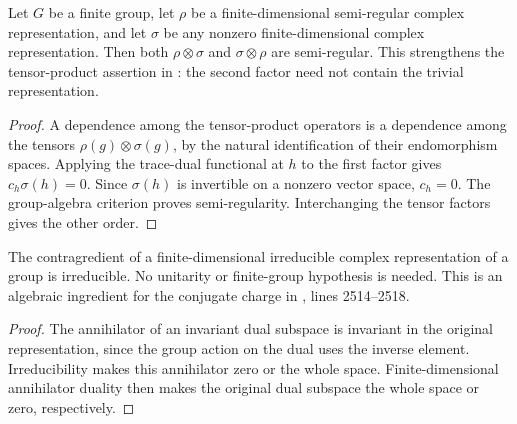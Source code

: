 \begin{lemma}
    \label{thm:peps_semiregular_nonzero_tensor}
    \leanok
    Let $G$ be a finite group, let $\rho$ be a finite-dimensional
    semi-regular complex representation, and let $\sigma$ be any
    nonzero finite-dimensional complex representation. Then both
    $\rho\otimes\sigma$ and $\sigma\otimes\rho$ are semi-regular.
    This strengthens the tensor-product assertion in
    \cite[Lemma~5.2]{Schuch2010PEPS}: the second factor need not contain
    the trivial representation.
\end{lemma}
\begin{proof}\leanok
    A dependence among the tensor-product operators is a dependence
    among the tensors $\rho(g)\otimes\sigma(g)$, by the natural
    identification of their endomorphism spaces. Applying the
    trace-dual functional at $h$ to the first factor gives
    $c_h\sigma(h)=0$. Since $\sigma(h)$ is invertible on a nonzero
    vector space, $c_h=0$. The group-algebra criterion proves
    semi-regularity. Interchanging the tensor factors gives the
    other order.
\end{proof}

\begin{lemma}
    \label{thm:peps_irreducible_dual}
    \leanok
    The contragredient of a finite-dimensional irreducible complex
    representation of a group is irreducible. No unitarity or finite-group
    hypothesis is needed. This is an algebraic ingredient for the
    conjugate charge in \cite{Schuch2010PEPS}, lines 2514--2518.
\end{lemma}
\begin{proof}\leanok
    The annihilator of an invariant dual subspace is invariant in the
    original representation, since the group action on the dual uses
    the inverse element. Irreducibility makes this annihilator zero or
    the whole space. Finite-dimensional annihilator duality then makes
    the original dual subspace the whole space or zero, respectively.
\end{proof}
